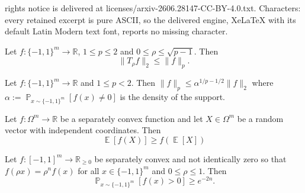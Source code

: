 \documentclass[10pt,a4paper]{amsart}
\newcommand{\E}{\mathop{\mathbb{E}}}
\providecommand{\setR}{\mathbb{R}}
\renewcommand{\Pr}{\mathop{\mathbb{P}}}
\begin{document}
rights notice is delivered at licenses/arxiv-2606.28147-CC-BY-4.0.txt. Characters: every retained excerpt is pure ASCII, so the delivered engine, XeLaTeX with its default Latin Modern text font, reports no missing character.
\begin{theorem}\label{thm:hypercontractivity}
Let $f:\{-1,1\}^m\to\setR$, $1\le p\le 2$ and $0\le\rho\le\sqrt{ p-1}$. Then \[ \|T_\rho f\|_2 \le \|f\|_p.\]
\end{theorem}

\begin{lemma} \label{lem:fp-vs-f2}
  Let $f : \{ -1,1\}^m \to \setR$ and $1 \leq p < 2$. Then $\|f\|_p \leq \alpha^{1/p-1/2}\|f\|_2$
  where $\alpha := \Pr_{x \sim \{ -1,1\}^m}[f(x) \neq 0]$ is the density of the support.
\end{lemma}

\begin{lemma} \label{lem:JensenForSepConvexFcts}
  Let $f : \Omega^m \to \setR$ be a separately convex function and let $X \in \Omega^m$ be a random vector with independent coordinates. Then
  \[
    \E[f(X)] \geq f(\E[X])
  \]
\end{lemma}

\begin{lemma}\label{lem:hyperhomog}
Let $f : [-1,1]^m \to \mathbb{R}_{\ge 0}$ be separately convex and not identically zero so that $f(\rho x) = \rho^n f(x)$ for all $x \in \{-1,1\}^m$ and $0 \leq \rho \leq 1$. Then \[ \Pr_{x \sim \{-1,1\}^m } [f(x) > 0] \ge e^{-2n}. \]
\end{lemma}
\end{document}
